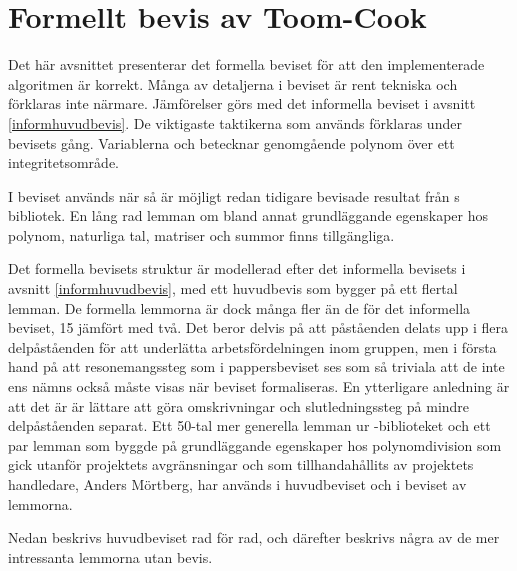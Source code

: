 \section{Formellt bevis av Toom-Cook}
\label{sec:formellbevis}
Det här avsnittet presenterar det formella beviset för att den implementerade
algoritmen är korrekt. Många av detaljerna i beviset är rent tekniska och
förklaras inte närmare. Jämförelser görs med det informella beviset i avsnitt
\ref{informhuvudbevis}. De viktigaste taktikerna som används förklaras under
bevisets gång. Variablerna  och  betecknar genomgående polynom över
ett integritetsområde.

I beviset används när så är möjligt redan tidigare bevisade resultat från \ssr
s bibliotek. En lång rad lemman om bland annat grundläggande egenskaper hos
polynom, naturliga tal, matriser och summor finns tillgängliga.

Det formella bevisets struktur är modellerad efter det informella bevisets i
avsnitt \ref{informhuvudbevis}, med ett huvudbevis som bygger på ett flertal
lemman. De formella lemmorna är dock många fler än de för det informella
beviset, 15 jämfört med två. Det beror delvis på att påståenden delats upp i
flera delpåståenden för att underlätta arbetsfördelningen inom gruppen, men i
första hand på att resonemangssteg som i pappersbeviset ses som så triviala att
de inte ens nämns också måste visas när beviset formaliseras. En ytterligare
anledning är att det är är lättare att göra omskrivningar och slutledningssteg
på mindre delpåståenden separat. Ett 50-tal mer generella lemman ur
\ssr-biblioteket och ett par lemman som byggde på grundläggande egenskaper hos
polynomdivision som gick utanför projektets avgränsningar och som
tillhandahållits av projektets handledare, Anders Mörtberg, har används i
huvudbeviset och i beviset av lemmorna.

Nedan beskrivs huvudbeviset rad för rad, och därefter beskrivs några av de mer intressanta
lemmorna utan bevis.

